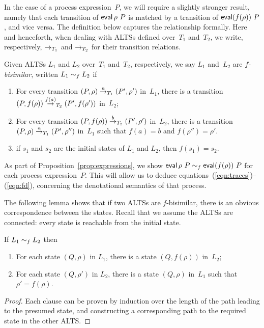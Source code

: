 In the case of a process expression~$P$, we will require a slightly stronger
result, namely that each transition of $\mathop{\sf eval} \rho ~ P$ is matched by a
transition of $\mathop{\sf eval} (f(\rho)) ~P$, and vice versa.  The definition below
captures the relationship formally.  Here and henceforth, when dealing with
ALTSs defined over~$T_1$ and~$T_2$, we write, respectively, $\stackrel{}{\rightarrow}_{T_1}$
and $\stackrel{}{\rightarrow}_{T_2}$ for their transition relations.  
%
\begin{definition}
\label{def:f-bisim}
Given ALTSs $L_1$ and $L_2$ over~$T_1$ and~$T_2$, respectively, we say $L_1$
and~$L_2$ are \emph{$f$-bisimilar}, written $L_1 \sim_f L_2$ if
%
\begin{enumerate}
\item For every transition $(P, \rho) \stackrel{a}{\rightarrow}_{T_1} (P', \rho')$ in~$L_1$,
  there is a transition $(P, f(\rho)) \stackrel{f(a)}{\rightarrow}_{T_2} (P', f(\rho'))$
  in~$L_2$;

\item For every transition $(P, f(\rho)) \stackrel{b}{\rightarrow}_{T_2} (P', \rho')$
  in~$L_2$, there is a transition $(P, \rho) \stackrel{a}{\rightarrow}_{T_1} (P', \rho'')$
  in~$L_1$ such that $f(a) = b$ and $f(\rho'') = \rho'$.

\item if $s_1$ and $s_2$ are the initial states of $L_1$ and $L_2$,
   then $f(s_1) = s_2$. 
\end{enumerate}
\end{definition}


As part of Proposition~\ref{prop:expressions}, we show $\mathop{\sf eval} \rho ~ P
\sim_f \mathop{\sf eval} (f(\rho)) ~P$ for each process expression~$P$.  This
will allow us to deduce equations~(\ref{eqn:traces})--(\ref{eqn:fd}),
concerning the denotational semantics of that process.

The following lemma shows that if two ALTSs are $f$-bisimilar, there is an
obvious correspondence between the states.  Recall that we assume the ALTSs
are connected: every state is reachable from the initial state.
%
\begin{lemma}
\label{lem:f-bisim-implies-states}
If $L_1 \sim_f L_2$ then
%
\begin{enumerate}
\item For each state $(Q,\rho)$ in $L_1$, there is a state $(Q,f(\rho))$
  in~$L_2$;

\item For each state $(Q,\rho')$ in $L_2$, there is a state $(Q,\rho)$
  in~$L_1$ such that $\rho' = f(\rho)$.
\end{enumerate}
\end{lemma}
%
\begin{proof}
Each clause can be proven by induction over the length of the path leading to
the presumed state, and constructing a corresponding path to the required
state in the other ALTS. 
\end{proof}

